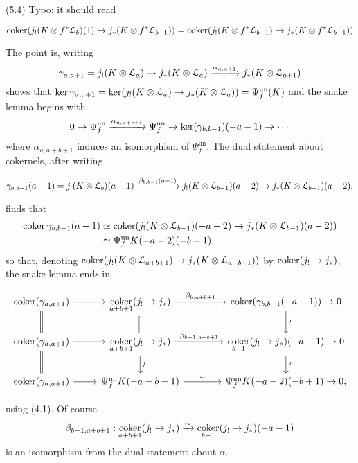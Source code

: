 \documentclass[deligne.tex]{subfiles}
\begin{document}
(5.4) Typo: it should read
\begin{ceqn}\begin{equation*}
	\operatorname{coker}(j_!(K\otimes f^*\mathcal L_b)(1)\rightarrow j_*(K\otimes f^*\mathcal L_{b-1}))
	=\operatorname{coker}(j_!(K\otimes f^*\mathcal L_{b-1})\rightarrow j_*(K\otimes f^*\mathcal L_{b-1}))
\end{equation*}\end{ceqn}
The point is, writing
\begin{equation*}
	\gamma_{a,a+1}=j_!(K\otimes\mathcal L_a)\rightarrow j_*(K\otimes\mathcal L_a)\xrightarrow{\alpha_{a,a+1}}j_*(K\otimes\mathcal L_{a+1})
\end{equation*}
shows that $\ker\gamma_{a,a+1}=\ker(j_!(K\otimes\mathcal L_a)\rightarrow j_*(K\otimes\mathcal L_a))=\Psi_f^{\mathrm{un}}(K)$ and the snake lemma
begins with
\begin{equation*}
	0\rightarrow\Psi_f^{\mathrm{un}}\xrightarrow{\alpha_{a,a+b+1}}\Psi_f^{\mathrm{un}}\rightarrow
	\ker(\gamma_{b,b-1})(-a-1)\rightarrow\cdots
\end{equation*}
where $\alpha_{a,a+b+1}$ induces an isomorphism of $\Psi_f^{\mathrm{un}}$.
The dual statement about cokernels, after writing
\begin{ceqn}\begin{equation*}
	\gamma_{b,b-1}(a-1)=j_!(K\otimes\mathcal L_b)(a-1)\xrightarrow{\beta_{b,b-1}(a-1)}j_!(K\otimes\mathcal L_{b-1})(a-2)\rightarrow j_*(K\otimes\mathcal L_{b-1})(a-2),
\end{equation*}\end{ceqn}
finds that
\begin{align*}
	\operatorname{coker}\gamma_{b,b-1}(a-1)
	&\simeq\operatorname{coker}(j_!(K\otimes\mathcal L_{b-1})(-a-2)\rightarrow j_*(K\otimes\mathcal L_{b-1})(a-2)) \\
	&\simeq\Psi_f^{\mathrm{un}}K(-a-2)(-b+1)
\end{align*}
so that, denoting
$\operatorname{coker}(j_!(K\otimes\mathcal L_{a+b+1})\rightarrow j_*(K\otimes\mathcal L_{a+b+1}))$
by $\operatorname{coker}(j_!\rightarrow j_*)$, the snake lemma ends in
\begin{ceqn}\begin{equation*}\begin{tikzcd}
	\coker(\gamma_{a,a+1})\arrow[r]\arrow[d,equals]
	&\underset{a+b+1}{\coker}(j_!\ra j_*)
	\arrow[r,"\beta_{b,a+b+1}"]\arrow[d,equals]
	&[15pt]\coker(\gamma_{b,b-1}(-a-1))\arrow[d,"\rsim"]\ra0 \\
	\coker(\gamma_{a,a+1})\arrow[r]\arrow[d,equals]
	&\underset{a+b+1}{\coker}(j_!\ra j_*)
	\arrow[r,"\beta_{b-1,a+b+1}"]\arrow[d,"\rsim"]
	&[15pt]\underset{b-1}{\coker}(j_!\ra j_*)(-a-1)\arrow[d,"\rsim"]\ra0 \\
	\coker(\gamma_{a,a+1})\arrow[r]
	&\Psi_f^{\mathrm{un}}K(-a-b-1)
	\arrow[r,"\sim"]
	&\Psi_f^{\mathrm{un}}K(-a-2)(-b+1)\ra0,
\end{tikzcd}\end{equation*}\end{ceqn}
using (4.1). Of course
\begin{equation*}
	\beta_{b-1,a+b+1}:\underset{a+b+1}{\operatorname{coker}}(j_!\rightarrow j_*)\xrightarrow\sim
	\underset{b-1}{\operatorname{coker}}(j_!\rightarrow j_*)(-a-1)
\end{equation*}
is an isomorphism from the dual statement about $\alpha$.
\end{document}
